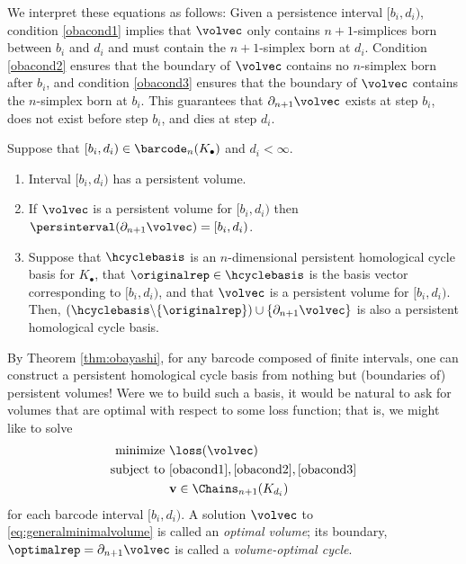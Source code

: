 We interpret these equations as follows: Given a persistence interval $[b_i,d_i)$, condition \eqref{obacond1} implies that $\volvec$ only contains $n+1$-simplices born between $b_i$ and $d_i$ and must contain the $n+1$-simplex born at $d_i$. Condition \eqref{obacond2} ensures that the boundary of $\volvec$ contains no $n$-simplex born after $b_i$, and condition \eqref{obacond3} ensures that the boundary of $\volvec$ contains the $n$-simplex born at $b_i$. This guarantees that $\partial_{n+1}\volvec$ exists at step $b_i$, does not exist before step $b_i$, and dies at step $d_i$.

%
\begin{theorem}  
\label{thm:obayashi}
Suppose that $[b_i, d_i) \in \barcode_n(K_\bullet)$ and  $d_i < \infty$.
    \begin{enumerate}
        \item Interval $[b_i, d_i)$ has a persistent volume.
        \item If $\volvec$ is a persistent volume for $[b_i, d_i)$ then $\persinterval(\partial_{n+1}\volvec) = [b_i, d_i)$.
        \item Suppose that $\hcyclebasis$ is an $n$-dimensional persistent homological cycle basis for $K_\bullet$, that $\originalrep \in \hcyclebasis$ is the basis vector corresponding to $[b_i, d_i)$, and that $\volvec$ is a persistent volume for $[b_i, d_i)$.  Then, $(\hcyclebasis \backslash \{\originalrep\}) \cup \{\partial_{n+1}\volvec\} $ 
        is also a persistent homological cycle basis.
    \end{enumerate}
\end{theorem}

By Theorem \ref{thm:obayashi}, for any barcode composed of finite intervals, one can construct a persistent homological cycle basis from nothing but (boundaries of) persistent volumes!  Were we to build such a basis, it would be natural to ask for volumes that are optimal with respect to some loss function; that is, we might like to solve
\begin{align}
\begin{split}
    \text{minimize } & \loss(\volvec) \\
    \text{subject to } 
    & \eqref{obacond1}, \eqref{obacond2}, \eqref{obacond3}\\
    & \textbf{v} \in \Chains_{n+1}(K_{d_i}) 
\end{split}
\label{eq:generalminimalvolume}
\end{align}
for each barcode interval $[b_i, d_i)$.  A solution $\volvec$ to \pr \eqref{eq:generalminimalvolume} is called an \emph{optimal volume}; its boundary, $\optimalrep=\partial_{n+1}\volvec$ is called a \emph{volume-optimal cycle}.

